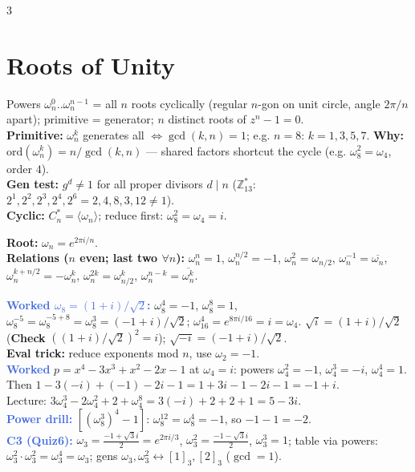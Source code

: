 \documentclass[9pt]{extarticle}
\newcommand{\hl}[1]{\textbf{\textcolor{BrickRed}{#1}}}
\newcommand{\wk}[1]{\textbf{\textcolor{OliveGreen}{#1}}}
\newcommand{\ex}[1]{\textbf{\textcolor{RoyalBlue}{#1}}}
\begin{document}
\begin{multicols}{3}
\section{Roots of Unity}
\begin{sloppypar}\raggedright
Powers $\omega_n^0..\omega_n^{n-1}$ = all $n$ roots cyclically (regular $n$-gon on unit circle, angle $2\pi/n$ apart); primitive = generator; $n$ distinct roots of $z^n{-}1{=}0$.\\
\hl{Primitive:} $\omega_n^k$ generates all $\iff\gcd(k,n){=}1$; e.g. $n{=}8$: $k{=}1,3,5,7$. \wk{Why:} $\mathrm{ord}(\omega_n^k){=}n/\gcd(k,n)$ — shared factors shortcut the cycle (e.g. $\omega_8^2{=}\omega_4$, order $4$).\\
\wk{Gen test:} $g^d{\ne}1$ for all proper divisors $d{\mid}n$ ($\mathbb Z_{13}^*$: $2^1,2^2,2^3,2^4,2^6{=}2,4,8,3,12{\ne}1$).\\
\hl{Cyclic:} $C_n^*{=}\langle\omega_n\rangle$; reduce first: $\omega_8^2{=}\omega_4{=}i$.
\end{sloppypar}
\begin{kbox}\raggedright
\textbf{Root:} \hl{$\omega_n{=}e^{2\pi i/n}$}.\\
\textbf{Relations ($n$ even; last two $\forall n$):} $\omega_n^n{=}1$, $\omega_n^{n/2}{=}{-}1$, $\omega_n^2{=}\omega_{n/2}$, $\omega_n^{-1}{=}\overline{\omega_n}$, $\omega_n^{k+n/2}{=}{-}\omega_n^k$, $\omega_n^{2k}{=}\omega_{n/2}^k$, $\omega_n^{n-k}{=}\overline{\omega_n^k}$.
\end{kbox}
\begin{sloppypar}\raggedright
\ex{Worked $\omega_8{=}(1{+}i)/\sqrt2$:} $\omega_8^4{=}{-}1$, $\omega_8^8{=}1$, $\omega_8^{-5}{=}\omega_8^{-5+8}{=}\omega_8^3{=}({-}1{+}i)/\sqrt2$; $\omega_{16}^4{=}e^{8\pi i/16}{=}i{=}\omega_4$. $\sqrt{i}{=}(1{+}i)/\sqrt2$ (\wk{Check} $((1{+}i)/\sqrt2)^2{=}i$); $\sqrt{-i}{=}({-}1{+}i)/\sqrt2$.\\
\wk{Eval trick:} reduce exponents mod $n$, use $\omega_2{=}{-}1$.\\
\ex{Worked} $p{=}x^4{-}3x^3{+}x^2{-}2x{-}1$ at $\omega_4{=}i$: powers $\omega_4^2{=}{-}1$, $\omega_4^3{=}{-}i$, $\omega_4^4{=}1$.\\
Then $1{-}3({-}i){+}({-}1){-}2i{-}1{=}1{+}3i{-}1{-}2i{-}1{=}{-}1{+}i$.\\
Lecture: $3\omega_4^3{-}2\omega_4^2{+}2{+}\omega_4^8{=}3({-}i){+}2{+}2{+}1{=}5{-}3i$.\\
\ex{Power drill:} $[(\omega_8^3)^4{-}1]$: $\omega_8^{12}{=}\omega_8^4{=}{-}1$, so ${-}1{-}1{=}{-}2$.\\
\ex{C3 (Quiz6):} $\omega_3{=}\frac{-1{+}\sqrt3 i}{2}{=}e^{2\pi i/3}$, $\omega_3^2{=}\frac{-1{-}\sqrt3 i}{2}$, $\omega_3^3{=}1$; table via powers: $\omega_3^2{\cdot}\omega_3^2{=}\omega_3^4{=}\omega_3$; gens $\omega_3,\omega_3^2{\leftrightarrow}[1]_3,[2]_3$ ($\gcd{=}1$).
\end{sloppypar}


\end{multicols}
\end{document}
